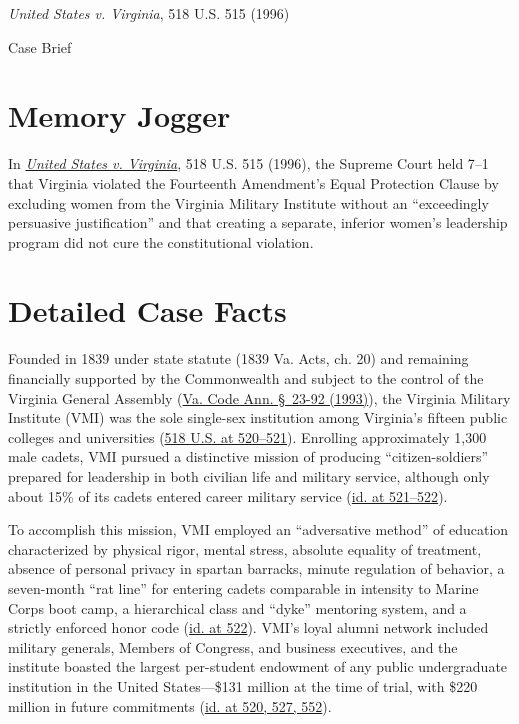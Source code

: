 \documentclass[12pt]{article}
\begin{document}
\begin{center}
{\LARGE \textit{United States v. Virginia}, 518 U.S. 515 (1996)\par}
\vspace{0.8em}
{\large Case Brief\par}
\end{center}
\vspace{1em}

\section{Memory Jogger}
In \href{https://www.courtlistener.com/opinion/118056/united-states-v-virginia/}{\textit{United States v. Virginia}}, 518 U.S. 515 (1996), the Supreme Court held 7--1 that Virginia violated the Fourteenth Amendment's Equal Protection Clause by excluding women from the Virginia Military Institute without an ``exceedingly persuasive justification'' and that creating a separate, inferior women's leadership program did not cure the constitutional violation.

\section{Detailed Case Facts}
Founded in 1839 under state statute (1839 Va. Acts, ch. 20) and remaining financially supported by the Commonwealth and subject to the control of the Virginia General Assembly (\href{https://supreme.justia.com/cases/federal/us/518/515/}{Va. Code Ann. \S~23-92 (1993)}), the Virginia Military Institute (VMI) was the sole single-sex institution among Virginia's fifteen public colleges and universities (\href{https://supreme.justia.com/cases/federal/us/518/515/}{518 U.S. at 520--521}). Enrolling approximately 1,300 male cadets, VMI pursued a distinctive mission of producing ``citizen-soldiers'' prepared for leadership in both civilian life and military service, although only about 15\% of its cadets entered career military service (\href{https://supreme.justia.com/cases/federal/us/518/515/}{id. at 521--522}).

To accomplish this mission, VMI employed an ``adversative method'' of education characterized by physical rigor, mental stress, absolute equality of treatment, absence of personal privacy in spartan barracks, minute regulation of behavior, a seven-month ``rat line'' for entering cadets comparable in intensity to Marine Corps boot camp, a hierarchical class and ``dyke'' mentoring system, and a strictly enforced honor code (\href{https://supreme.justia.com/cases/federal/us/518/515/}{id. at 522}). VMI's loyal alumni network included military generals, Members of Congress, and business executives, and the institute boasted the largest per-student endowment of any public undergraduate institution in the United States---\$131 million at the time of trial, with \$220 million in future commitments (\href{https://supreme.justia.com/cases/federal/us/518/515/}{id. at 520, 527, 552}).
\end{document}
